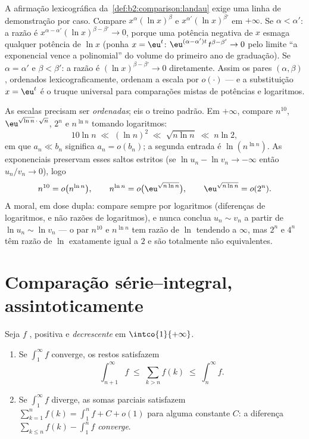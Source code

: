 \begin{example}\label{ex:b2:comparison:scaleorder}
A afirmação lexicográfica da~\cref{def:b2:comparison:landau}
exige uma linha de demonstração por caso. Compare
$x^{\alpha}(\ln x)^{\beta}$ e $x^{\alpha'}(\ln x)^{\beta'}$
em $+\infty$. Se $\alpha < \alpha'$: a razão é
$x^{\alpha - \alpha'}(\ln x)^{\beta - \beta'} \to 0$, porque uma
potência negativa de $x$ esmaga qualquer potência de $\ln x$ (ponha $x =
\eu^t$: $\eu^{(\alpha - \alpha')t}\,t^{\beta - \beta'} \to 0$
pelo limite ``a exponencial vence a polinomial'' do volume do primeiro
ano de graduação). Se $\alpha = \alpha'$ e $\beta < \beta'$: a razão
é $(\ln x)^{\beta - \beta'} \to 0$ diretamente. Assim os pares
$(\alpha, \beta)$, ordenados lexicograficamente, ordenam a escala
por $o(\cdot)$ --- e a substituição $x = \eu^t$ é o
truque universal para comparações mistas de potências e logaritmos.
\end{example}

\begin{example}\label{ex:b2:comparison:ranking}
As escalas precisam ser \emph{ordenadas}; eis o treino padrão. Em
$+\infty$, compare $n^{10}$, $\eu^{\sqrt{\ln n}\,\cdot\,\sqrt n}$,
$2^n$ e $n^{\ln n}$ tomando logaritmos:
\[
10\ln n
\;\ll\; (\ln n)^2
\;\ll\; \sqrt{n\ln n}
\;\ll\; n\ln 2 ,
\]
em que $a_n \ll b_n$ significa $a_n = o(b_n)$; a segunda entrada é
$\ln(n^{\ln n})$. As exponenciais preservam esses saltos estritos (se
$\ln u_n - \ln v_n \to -\infty$ então $u_n/v_n \to 0$), logo
\[
n^{10} = o\bigl(n^{\ln n}\bigr),
\qquad
n^{\ln n} = o\bigl(\eu^{\sqrt{n\ln n}}\bigr),
\qquad
\eu^{\sqrt{n\ln n}} = o(2^n) .
\]
A moral, em dose dupla: compare sempre por logaritmos
(diferenças de logaritmos, e não razões de logaritmos), e nunca conclua
$u_n \sim v_n$ a partir de $\ln u_n \sim \ln v_n$ --- o par $n^{10}$
e $n^{\ln n}$ tem razão de $\ln$ tendendo a $\infty$, mas $2^n$
e $4^n$ têm razão de $\ln$ exatamente igual a $2$ e são
totalmente não equivalentes.
\end{example}

\section{Comparação série--integral, assintoticamente}

\begin{theorem}\label{thm:b2:comparison:seriesintegral}
Seja $f$ , positiva e \emph{decrescente} em
$\intco{1}{+\infty}$.
\begin{enumerate}
  \item Se $\int_1^{\infty} f$ converge, os restos satisfazem
        \[
        \int_{n+1}^{\infty} f \;\leq\; \sum_{k > n} f(k) \;\leq\;
        \int_{n}^{\infty} f .
        \]
  \item Se $\int_1^\infty f$ diverge, as somas parciais satisfazem
        $\sum_{k=1}^{n} f(k) = \int_1^n f + C + o(1)$ para alguma
        constante $C$: a diferença $\sum_{k \leq n} f(k) -
        \int_1^n f$ \emph{converge}.
\end{enumerate}
\end{theorem}

